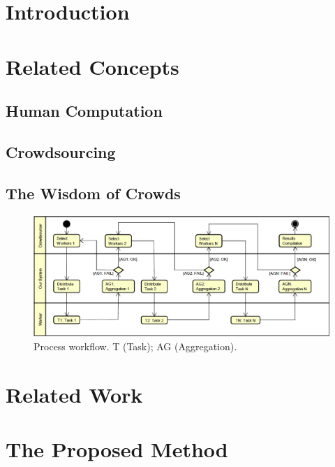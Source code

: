 \documentclass[sigconf]{acmart}
\begin{document}
\maketitle

\section{Introduction}
	

\section{Related Concepts}
	

	\subsection{Human Computation}
	

	\subsection{Crowdsourcing}
	

	\subsection{The Wisdom of Crowds}
	
	
	
\begin{figure}[!th]
	\centerline{\includegraphics[scale=0.36] {figure/method}}
	\caption{Process workflow. T (Task);  AG (Aggregation).}
	\label{method}
\end{figure}


\section{Related Work}
	




\section{The Proposed Method} 
	
\end{document}
